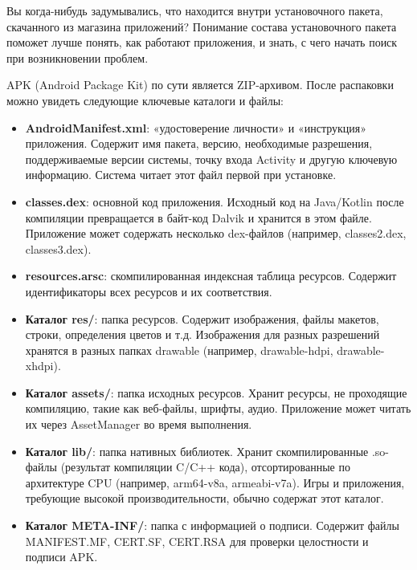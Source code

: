 
Вы когда-нибудь задумывались, что находится внутри установочного пакета, скачанного из магазина приложений? Понимание состава установочного пакета поможет лучше понять, как работают приложения, и знать, с чего начать поиск при возникновении проблем.


APK (Android Package Kit) по сути является ZIP-архивом. После распаковки можно увидеть следующие ключевые каталоги и файлы:

\begin{itemize}
  \item \textbf{AndroidManifest.xml}: «удостоверение личности» и «инструкция» приложения. Содержит имя пакета, версию, необходимые разрешения, поддерживаемые версии системы, точку входа Activity и другую ключевую информацию. Система читает этот файл первой при установке.
  \item \textbf{classes.dex}: основной код приложения. Исходный код на Java/Kotlin после компиляции превращается в байт-код Dalvik и хранится в этом файле. Приложение может содержать несколько dex-файлов (например, classes2.dex, classes3.dex).
  \item \textbf{resources.arsc}: скомпилированная индексная таблица ресурсов. Содержит идентификаторы всех ресурсов и их соответствия.
  \item \textbf{Каталог res/}: папка ресурсов. Содержит изображения, файлы макетов, строки, определения цветов и т.д. Изображения для разных разрешений хранятся в разных папках drawable (например, drawable-hdpi, drawable-xhdpi).
  \item \textbf{Каталог assets/}: папка исходных ресурсов. Хранит ресурсы, не проходящие компиляцию, такие как веб-файлы, шрифты, аудио. Приложение может читать их через AssetManager во время выполнения.
  \item \textbf{Каталог lib/}: папка нативных библиотек. Хранит скомпилированные .so-файлы (результат компиляции C/C++ кода), отсортированные по архитектуре CPU (например, arm64-v8a, armeabi-v7a). Игры и приложения, требующие высокой производительности, обычно содержат этот каталог.
  \item \textbf{Каталог META-INF/}: папка с информацией о подписи. Содержит файлы MANIFEST.MF, CERT.SF, CERT.RSA для проверки целостности и подписи APK.
\end{itemize}


